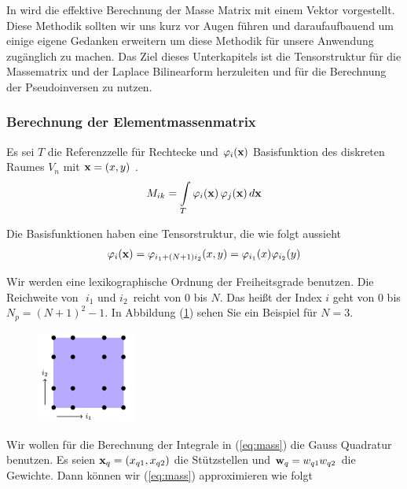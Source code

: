 In \cite{Teachlet} wird die effektive Berechnung der Masse Matrix mit einem Vektor vorgestellt. Diese Methodik sollten wir uns kurz vor Augen führen und daraufaufbauend um einige eigene Gedanken erweitern um diese Methodik für unsere Anwendung zugänglich zu machen.
Das Ziel dieses Unterkapitels ist die Tensorstruktur für die Massematrix und der Laplace Bilinearform herzuleiten und für die Berechnung der Pseudoinversen zu nutzen. 

\subsubsection{Berechnung der Elementmassenmatrix}
Es sei $T$ die Referenzzelle für Rechtecke und $\varphi_i(\bold{x})$ Basisfunktion des diskreten Raumes $V_n$ mit $\bold{x}=(x,y)$ .
\begin{equation} \label{eq:mass}
M_{ik} = \int\limits_{T} \varphi_i (\bold{x}) \, \varphi_j (\bold{x}) \, d\bold{x}
\end{equation}

Die Basisfunktionen haben eine Tensorstruktur, die wie folgt aussieht
\begin{equation} \label{eq:tensor}
\varphi_i(\bold{x})=\varphi_{i_1+(N+1)i_2}(x,y)=\varphi_{i_1}(x)\varphi_{i_2}(y)
\end{equation}

Wir werden eine lexikographische Ordnung der Freiheitsgrade benutzen. Die Reichweite von $\, \, i_1 $ und $ i_2 \, $ reicht von $0$ bis $N$. Das heißt der Index $i$ geht von $0$ bis $N_p=(N+1)^2-1$. In Abbildung (\ref{fig:lexi}) sehen Sie ein Beispiel für $N=3$.

\begin{figure}[ht] 
	\centering
  \includegraphics[width=0.3\textwidth]{lexi.png}
	\caption{ \cite[3]{Teachlet}}
	\label{fig:lexi}
\end{figure}

Wir wollen für die Berechnung der Integrale in (\ref{eq:mass}) die Gauss Quadratur benutzen.
Es seien $\bold{x}_q=(x_{q1},x_{q2})$ die Stützstellen und $\bold{w}_q=w_{q1}w_{q2}$ die Gewichte. Dann können wir (\ref{eq:mass}) approximieren wie folgt

